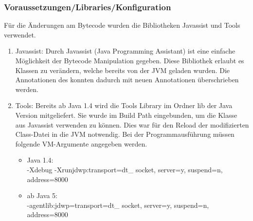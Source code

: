 \subsubsection{Voraussetzungen/Libraries/Konfiguration}
Für die Änderungen am Bytecode wurden die Bibliotheken Javassist und Tools verwendet. 

\begin{enumerate}
	\item Javassist: Durch Javassist (Java Programming Assistant) ist eine einfache M\"oglichkeit der Bytecode Manipulation gegeben. Diese Bibliothek erlaubt es Klassen zu ver\"andern, welche bereits von der JVM geladen wurden. Die Annotationen des  konnten dadurch mit neuen Annotationen überschrieben werden. 
	\item Tools: Bereits ab Java 1.4 wird die Tools Library im Ordner lib der Java Version mitgeliefert. Sie wurde im Build Path eingebunden, um die Klasse  aus Javassist verwenden zu können. Dies war für den Reload der modifizierten Class-Datei in die JVM notwendig. Bei der Programmausführung müssen folgende VM-Argumente angegeben werden.
	\begin{itemize}
		\item Java 1.4: \\-Xdebug -Xrunjdwp:transport=dt\_ socket, server=y, suspend=n, address=8000
		\item ab Java 5:\\ -agentlib:jdwp=transport=dt\_ socket, server=y, suspend=n, address=8000
	\end{itemize}		
\end{enumerate}


